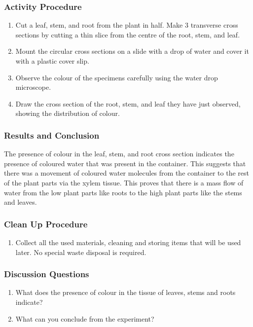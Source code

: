 \subsubsection*{Activity Procedure}
\begin{enumerate}
\item{Cut a leaf, stem, and root from the plant in half. Make 3 transverse cross sections by cutting a thin slice from the centre of the root, stem, and leaf.}
\item{Mount the circular cross sections on a slide with a drop of water and cover it with a plastic cover slip.}
\item{Observe the colour of the specimens carefully using the water drop microscope.}
\item{Draw the cross section of the root, stem, and leaf they have just observed, showing the distribution of colour.}
\end{enumerate}

\subsubsection*{Results and Conclusion}
The presence of colour in the leaf, stem, and root cross section indicates the presence of coloured water that was present in the container. This suggests that there was a movement of coloured water molecules from the container to the rest of the plant parts via the xylem tissue. This proves that there is a mass flow of water from the low plant parts like roots to the high plant parts like the stems and leaves.

\subsubsection*{Clean Up Procedure}
\begin{enumerate}
\item{Collect all the used materials, cleaning and storing items that will be used later. No special waste disposal is required.}
\end{enumerate}

\subsubsection*{Discussion Questions}
\begin{enumerate}
\item{What does the presence of colour in the tissue of leaves, stems and roots indicate?}
\item{What can you conclude from the experiment?}
\end{enumerate}

